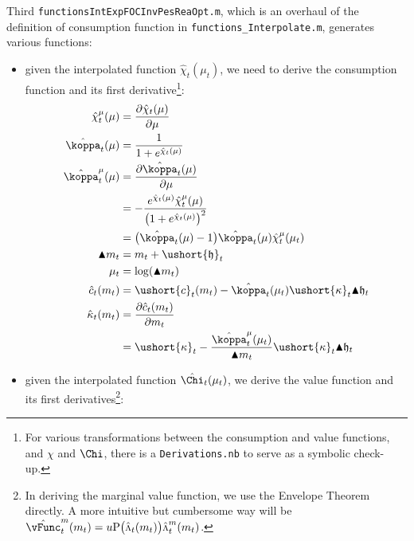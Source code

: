 \documentclass[titlepage,abstract]{\econtex}
\providecommand{\vInv}{\ensuremath{\scriptstyle \Lambda \displaystyle}}
\begin{document}
Third \texttt{functionsIntExpFOCInvPesReaOpt.m}, which is an overhaul of the definition of consumption function in \texttt{functions\_Interpolate.m}, generates various functions:
\begin{itemize}
        \item given the interpolated function $\hat{\chi}_{t}(\mu_{t})$, we need to derive the consumption function and its first derivative\footnote{For various transformations between the consumption and value functions, and $\chi$ and $\Chi$, there is a \texttt{Derivations.nb} to serve as a symbolic check-up.}:
            \begin{equation}\begin{gathered}\begin{aligned}
            \hat{\chi}^{\mu}_{t}(\mu)  & =  \frac{\partial \hat{\chi}_{t}(\mu)}{\partial \mu} \\
            \hat{\koppa}_{t} (\mu)  & = \frac{1}{1+e^{\hat{\chi}_{t}(\mu)}} \\
            \hat{\koppa}^{\mu}_{t} (\mu)  & =  \frac{\partial \hat{\koppa}_{t} (\mu)}{\partial \mu} \\
             & =  -\frac{e^{\hat{\chi}_{t}(\mu)} \hat{\chi}^{\mu}_{t}(\mu)}{\big(1+e^{\hat{\chi}_{t}(\mu)}\big)^{2}} \\
             & =  \big(\hat{\koppa}_{t} (\mu)-1\big)\hat{\koppa}_{t} (\mu) \hat{\chi}^{\mu}_{t}(\mu_{t}) \\
            \blacktriangle m_{t}  & =  m_{t} + \ushort{\mathfrak{h}}_{t} \\
            \mu_{t}  & =  \log(\blacktriangle m_{t}) \\
            \hat{c}_{t}(m_{t})  & =  \ushort{c}_{t}(m_{t})-\hat{\koppa}_{t}(\mu_{t}) \ushort{\kappa}_{t} \blacktriangle \mathfrak{h}_{t} \\
            \hat{\kappa}_{t}(m_{t})  & =  \frac{\partial \hat{c}_{t}(m_{t})}{\partial m_{t}} \\
             & =  \ushort{\kappa}_{t}-\frac{\hat{\koppa}^{\mu}_{t}(\mu_{t})}{\blacktriangle m_{t}} \ushort{\kappa}_{t} \blacktriangle \mathfrak{h}_{t} \\
            \end{aligned}\end{gathered}\end{equation}
        \item given the interpolated function $\hat{\Chi}_{t}(\mu_{t})$, we derive the value function and its first derivatives\footnote{In deriving the marginal value function, we use the Envelope Theorem directly. A more intuitive but cumbersome way will be $\hat{\vFunc}_{t}^{m} (m_{t}) = u\text{P}\big(\hat{\vInv}_{t}(m_{t})\big) \hat{\vInv}_{t}^{m} (m_{t})$.}:

\end{itemize}
\end{document}
